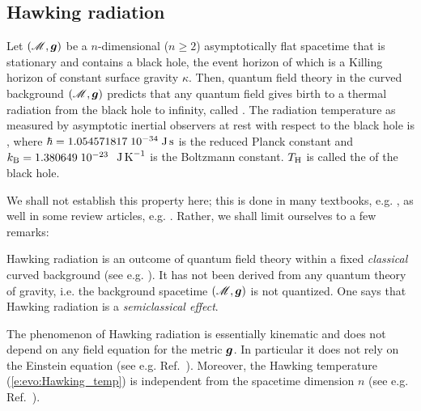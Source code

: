 \subsection{Hawking radiation} \label{s:evo:Hawking_rad}

\begin{prop}
Let $(\mathscr{M},\bm{g})$ be a $n$-dimensional ($n\geq 2$) asymptotically flat
spacetime that is stationary and contains a black hole, the event horizon
of which is a Killing horizon of constant surface gravity $\kappa$.
Then, quantum field theory in the curved background $(\mathscr{M},\bm{g})$
predicts that any quantum field gives birth to a thermal radiation
from the black hole to infinity, called
. The radiation temperature
as measured by asymptotic inertial observers at rest with respect to the black hole
is
\be \label{e:evo:Hawking_temp}
     ,
\ee
where $\hbar = 1.054571817\; 10^{-34} {\rm\; J\, s}$ is the reduced Planck constant and
$k_{\rm B} = 1.380649\; 10^{-23}$ ${\rm\;  J\, K}^{-1}$ is the Boltzmann constant. $T_{\rm H}$ is called the
 of the black hole.
\end{prop}

We shall not establish this property here; this is done in many textbooks,
e.g. \cite{Wald84,Wald94,FroloN98,Carro04,FabbrN05}, as well in some review
articles, e.g. \cite{BroutMPS95,Damou04,Jacob96}. Rather, we shall limit
ourselves to a few remarks:


\begin{remark}
Hawking radiation is an outcome of quantum field theory within a fixed \emph{classical} curved background
(see e.g. \cite{Wald94}). It has not been derived from any quantum theory of gravity, i.e. the background spacetime $(\mathscr{M},\bm{g})$ is not quantized. One says that Hawking radiation is
a \emph{semiclassical effect}.
\end{remark}

\begin{remark} \label{r:evo:Hawking_rad_kinematic}
The phenomenon of Hawking radiation is essentially kinematic and does not depend on any field equation for the
metric $\bm{g}$. In particular it does not rely on the Einstein equation
(see e.g. Ref.~\cite{Visse98}).
Moreover, the Hawking temperature (\ref{e:evo:Hawking_temp}) is independent from the spacetime dimension
$n$ (see e.g. Ref.~\cite{KantiW15}).
\end{remark}

